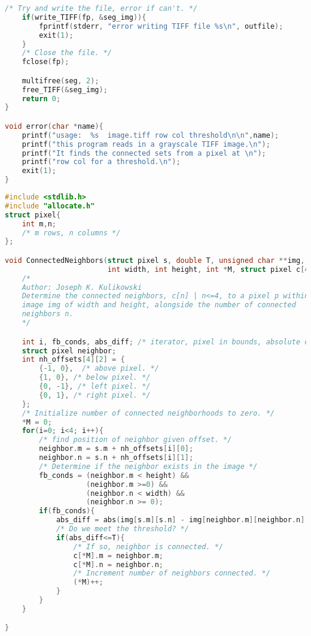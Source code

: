 \documentclass{article}
\begin{document}
\begin{lstlisting}[language=C, caption=sec\_1.c, label={lst:sec1}]
    /* Try and write the file, error if can't. */
    if(write_TIFF(fp, &seg_img)){
        fprintf(stderr, "error writing TIFF file %s\n", outfile);
        exit(1);
    }
    /* Close the file. */
    fclose(fp);

    multifree(seg, 2);
    free_TIFF(&seg_img);
    return 0;
}

void error(char *name){
    printf("usage:  %s  image.tiff row col threshold\n\n",name);
    printf("this program reads in a grayscale TIFF image.\n");
    printf("It finds the connected sets from a pixel at \n");
    printf("row col for a threshold.\n");
    exit(1);
}
\end{lstlisting}
\begin{lstlisting}[language=C, caption=connected\_neighbors\_sets.c, label={lst:connsets}]
#include <stdlib.h>
#include "allocate.h"
struct pixel{
    int m,n;
    /* m rows, n columns */
};

void ConnectedNeighbors(struct pixel s, double T, unsigned char **img,
                        int width, int height, int *M, struct pixel c[4]){
    /*
    Author: Joseph K. Kulikowski
    Determine the connected neighbors, c[n] | n<=4, to a pixel p within an
    image img of width and height, alongside the number of connected
    neighbors n.
    */

    int i, fb_conds, abs_diff; /* iterator, pixel in bounds, absolute difference*/
    struct pixel neighbor;
    int nh_offsets[4][2] = {
        {-1, 0},  /* above pixel. */
        {1, 0}, /* below pixel. */
        {0, -1}, /* left pixel. */
        {0, 1}, /* right pixel. */
    };
    /* Initialize number of connected neighborhoods to zero. */
    *M = 0;
    for(i=0; i<4; i++){
        /* find position of neighbor given offset. */
        neighbor.m = s.m + nh_offsets[i][0];
        neighbor.n = s.n + nh_offsets[i][1];
        /* Determine if the neighbor exists in the image */
        fb_conds = (neighbor.m < height) &&
                   (neighbor.m >=0) &&
                   (neighbor.n < width) &&
                   (neighbor.n >= 0);
        if(fb_conds){
            abs_diff = abs(img[s.m][s.n] - img[neighbor.m][neighbor.n]);
            /* Do we meet the threshold? */
            if(abs_diff<=T){
                /* If so, neighbor is connected. */
                c[*M].m = neighbor.m;
                c[*M].n = neighbor.n;
                /* Increment number of neighbors connected. */
                (*M)++;
            }
        }
    }

}


\end{lstlisting}
\end{document}
